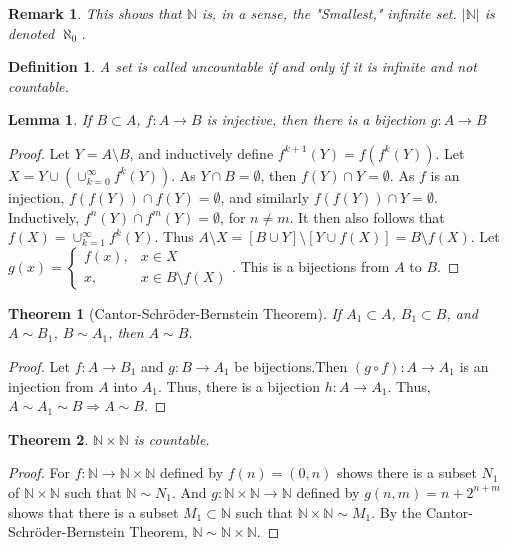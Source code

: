 \documentclass[12pt,oneside]{book}
\theoremstyle{mystyle}
\newtheorem{theorem}{Theorem}[section]
\newtheorem{definition}{Definition}[section]
\newtheorem{lemma}{Lemma}[section]
\newtheorem{remark}{Remark}[section]
\begin{document}
\begin{remark}
This shows that $\mathbb{N}$ is, in a sense, the "Smallest," infinite set. $|\mathbb{N}|$ is denoted $\aleph_0$.
\end{remark}

\begin{definition}
A set is called uncountable if and only if it is infinite and not countable.
\end{definition}

\begin{lemma}
If $B\subset A$, $f:A\rightarrow B$ is injective, then there is a bijection $g:A\rightarrow B$
\end{lemma}
\begin{proof}
Let $Y = A\setminus B$, and inductively define $f^{k+1}(Y) = f(f^{k}(Y))$. Let $X = Y\cup (\cup_{k=0}^{\infty} f^{k}(Y))$. As $Y\cap B = \emptyset$, then $f(Y)\cap Y= \emptyset$. As $f$ is an injection, $f(f(Y))\cap f(Y)=\emptyset$, and similarly $f(f(Y))\cap Y = \emptyset$. Inductively, $f^{n}(Y)\cap f^{m}(Y) = \emptyset$, for $n\ne m$. It then also follows that $f(X) = \cup_{k=1}^{\infty} f^{k}(Y)$. Thus $A\setminus X = [B\cup Y]\setminus [Y\cup f(X)] = B\setminus f(X)$. Let $g(x) = \begin{cases} f(x), & x\in X \\ x, & x \in B\setminus f(X)\end{cases}$. This is a bijections from $A$ to $B$.
\end{proof}

\begin{theorem}[Cantor-Schr\"{o}der-Bernstein Theorem]
If $A_1 \subset A$, $B_1 \subset B$, and $A\sim B_1$, $B \sim A_1$, then $A\sim B$.
\end{theorem}
\begin{proof}
Let $f:A\rightarrow B_1$ and $g:B\rightarrow A_1$ be bijections.Then $(g\circ f):A\rightarrow A_1$ is an injection from $A$ into $A_1$. Thus, there is a bijection $h:A\rightarrow A_1$. Thus, $A\sim A_1 \sim B\Rightarrow A\sim B$.
\end{proof}

\begin{theorem}
$\mathbb{N}\times \mathbb{N}$ is countable.
\end{theorem}
\begin{proof}
For $f:\mathbb{N} \rightarrow \mathbb{N}\times \mathbb{N}$ defined by $f(n) = (0,n)$ shows there is a subset $N_1$ of $\mathbb{N} \times \mathbb{N}$ such that $\mathbb{N}\sim N_1$. And $g:\mathbb{N}\times \mathbb{N} \rightarrow \mathbb{N}$ defined by $g(n,m) =n+2^{n+m}$ shows that there is a subset $M_1 \subset \mathbb{N}$ such that $\mathbb{N} \times \mathbb{N} \sim M_1$. By the Cantor-Schr\"{o}der-Bernstein Theorem, $\mathbb{N} \sim \mathbb{N}\times \mathbb{N}$.
\end{proof}
\end{document}
